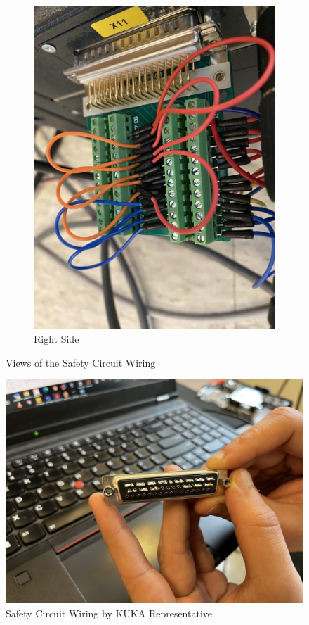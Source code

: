 \documentclass[12pt, letterpaper]{article}
\begin{document}
\begin{figure}
\begin{subfigure}[b]{0.32\textwidth}
        \includegraphics[width=\textwidth]{Images/IMG_1574.jpg}
        \caption{Right Side}
        \label{fig:safcr}
    \end{subfigure}
    \caption{Views of the Safety Circuit Wiring}
    \label{fig:safety-circuit-wiring}
\end{figure}

\begin{figure}[H]
    \centering
    \includegraphics[width=\textwidth]{Images/Physical Circuit.jpg}
    \caption{Safety Circuit Wiring by KUKA Representative}
    \label{fig:kuka-physical-circuit}
\end{figure}
\end{document}

